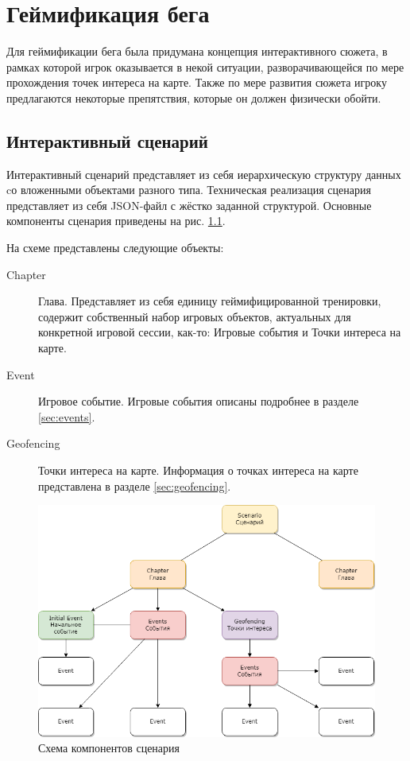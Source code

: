 \chapter{Геймификация бега}
Для геймификации бега была придумана концепция интерактивного сюжета, в рамках которой игрок оказывается в некой ситуации, разворачивающейся по мере прохождения точек интереса на карте. Также по мере развития сюжета игроку предлагаются некоторые препятствия, которые он должен физически обойти.
\section{Интерактивный сценарий}
Интерактивный сценарий представляет из себя иерархическую структуру данных cо вложенными объектами разного типа.
Техническая реализация сценария представляет из себя JSON-файл с жёстко заданной структурой. Основные компоненты сценария приведены на рис. \ref{fig:scenario_components}.

На схеме представлены следующие объекты:
\begin{description}
	\item[Chapter] Глава. Представляет из себя единицу геймифицированной тренировки, содержит собственный набор игровых объектов, актуальных для конкретной игровой сессии, как-то: Игровые события и Точки интереса на карте.
	\item[Event] Игровое событие. Игровые события описаны подробнее в разделе \ref{sec:events}.
	\item[Geofencing] Точки интереса на карте. Информация о точках интереса на карте представлена в разделе \ref{sec:geofencing}.
\end{description}
\smallskip
\begin{figure}[H]
	\centering
	\includegraphics[width=\textwidth]{flesh/runGamification/scenario.png}
	\caption{\label{fig:scenario_components}Схема компонентов сценария}
\end{figure}

